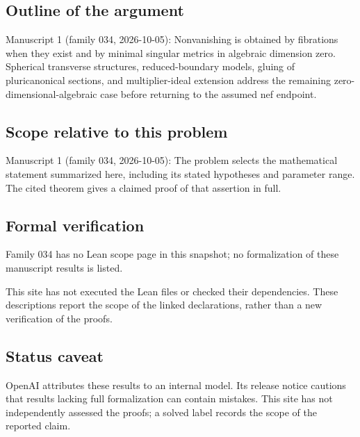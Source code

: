 \documentclass[11pt]{article}
\begin{document}
\subsection{Outline of the argument}
Manuscript 1 (family 034, 2026-10-05): Nonvanishing is obtained by fibrations when they exist and by minimal singular metrics in algebraic dimension zero. Spherical transverse structures, reduced-boundary models, gluing of pluricanonical sections, and multiplier-ideal extension address the remaining zero-dimensional-algebraic case before returning to the assumed nef endpoint.

\subsection{Scope relative to this problem}
Manuscript 1 (family 034, 2026-10-05): The problem selects the mathematical statement summarized here, including its stated hypotheses and parameter range. The cited theorem gives a claimed proof of that assertion in full.

\subsection{Formal verification}
Family 034 has no Lean scope page in this snapshot; no formalization of these manuscript results is listed.

This site has not executed the Lean files or checked their dependencies. These descriptions report the scope of the linked declarations, rather than a new verification of the proofs.

\subsection{Status caveat}
OpenAI attributes these results to an internal model. Its release notice cautions that results lacking full formalization can contain mistakes. This site has not independently assessed the proofs; a solved label records the scope of the reported claim.
\end{document}
